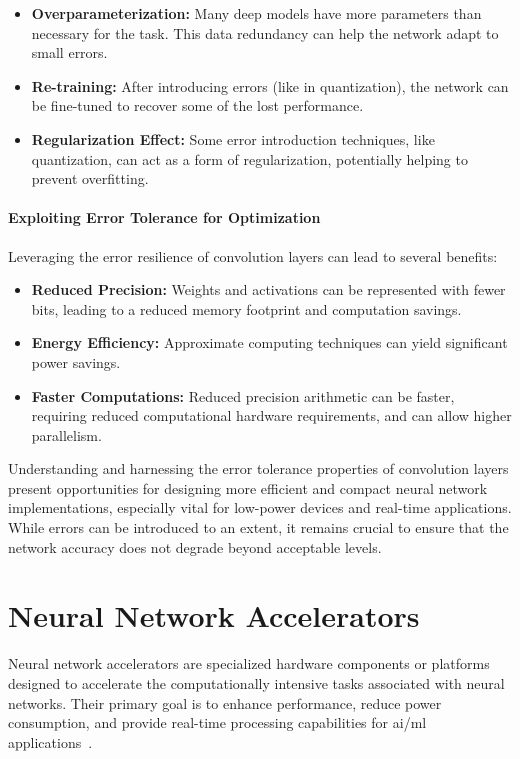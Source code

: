 \begin{itemize}
	\item \textbf{Overparameterization:} Many deep models have more parameters than necessary for the task. This data redundancy can help the network adapt to small errors.
	\item \textbf{Re-training:} After introducing errors (like in quantization), the network can be fine-tuned to recover some of the lost performance.
	\item \textbf{Regularization Effect:} Some error introduction techniques, like quantization, can act as a form of regularization, potentially helping to prevent overfitting.
\end{itemize}

\paragraph{Exploiting Error Tolerance for Optimization}

Leveraging the error resilience of convolution layers can lead to several benefits:

\begin{itemize}
	\item \textbf{Reduced Precision:} Weights and activations can be represented with fewer bits, leading to a reduced memory footprint and computation savings.
	\item \textbf{Energy Efficiency:} Approximate computing techniques can yield significant power savings.
	\item \textbf{Faster Computations:} Reduced precision arithmetic can be faster, requiring reduced computational hardware requirements, and can allow higher parallelism.
\end{itemize}

Understanding and harnessing the error tolerance properties of convolution layers present opportunities for designing more efficient and compact neural network implementations, especially vital for low-power devices and real-time applications. While errors can be introduced to an extent, it remains crucial to ensure that the network accuracy does not degrade beyond acceptable levels.


\section{Neural Network Accelerators}
Neural network accelerators are specialized hardware components or platforms designed to accelerate the computationally intensive tasks associated with neural networks. Their primary goal is to enhance performance, reduce power consumption, and provide real-time processing capabilities for \gls{ai}/\gls{ml} applications~\cite{sze2017efficient}.

